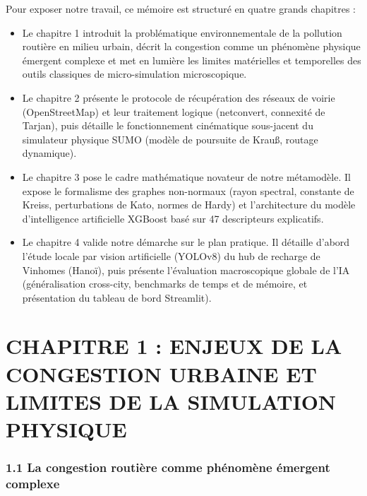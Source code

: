 \documentclass[10pt, a4paper]{article}
\providecommand{\tightlist}{}
\begin{document}
Pour exposer notre travail, ce mémoire est structuré en quatre grands
chapitres :

\begin{itemize}
\tightlist
\item
  Le chapitre 1 introduit la problématique environnementale de la
  pollution routière en milieu urbain, décrit la congestion comme un
  phénomène physique émergent complexe et met en lumière les limites
  matérielles et temporelles des outils classiques de micro-simulation
  microscopique.
\item
  Le chapitre 2 présente le protocole de récupération des réseaux de
  voirie (OpenStreetMap) et leur traitement logique (netconvert,
  connexité de Tarjan), puis détaille le fonctionnement cinématique
  sous-jacent du simulateur physique SUMO (modèle de poursuite de Krauß,
  routage dynamique).
\item
  Le chapitre 3 pose le cadre mathématique novateur de notre métamodèle.
  Il expose le formalisme des graphes non-normaux (rayon spectral,
  constante de Kreiss, perturbations de Kato, normes de Hardy) et
  l'architecture du modèle d'intelligence artificielle XGBoost basé sur
  47 descripteurs explicatifs.
\item
  Le chapitre 4 valide notre démarche sur le plan pratique. Il détaille
  d'abord l'étude locale par vision artificielle (YOLOv8) du hub de
  recharge de Vinhomes (Hanoï), puis présente l'évaluation macroscopique
  globale de l'IA (généralisation cross-city, benchmarks de temps et de
  mémoire, et présentation du tableau de bord Streamlit).
\end{itemize}

\newpage

\section{CHAPITRE 1 : ENJEUX DE LA CONGESTION URBAINE ET LIMITES DE LA
SIMULATION
PHYSIQUE}\label{chapitre-1-enjeux-de-la-congestion-urbaine-et-limites-de-la-simulation-physique}

\subsubsection{1.1 La congestion routière comme phénomène émergent
complexe}\label{la-congestion-routiuxe8re-comme-phuxe9nomuxe8ne-uxe9mergent-complexe}
\end{document}
